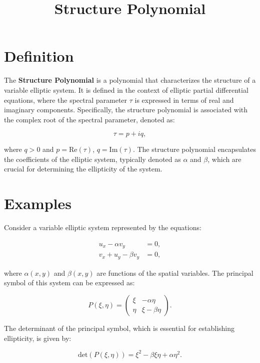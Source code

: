 \documentclass[11pt,a4paper]{article}
\title{Structure Polynomial}
\date{}
\begin{document}
\maketitle
\section{Definition}
The \textbf{Structure Polynomial} is a polynomial that characterizes the structure of a variable elliptic system. It is defined in the context of elliptic partial differential equations, where the spectral parameter $\tau$ is expressed in terms of real and imaginary components. Specifically, the structure polynomial is associated with the complex root of the spectral parameter, denoted as:

\begin{equation}
\tau = p + iq,
\end{equation}

where $q > 0$ and $p = \text{Re}(\tau)$, $q = \text{Im}(\tau)$. The structure polynomial encapsulates the coefficients of the elliptic system, typically denoted as $\alpha$ and $\beta$, which are crucial for determining the ellipticity of the system.

\section{Examples}
Consider a variable elliptic system represented by the equations:

\begin{equation}
\begin{aligned}
u_x - \alpha v_y &= 0, \\
v_x + u_y - \beta v_y &= 0,
\end{aligned}
\end{equation}

where $\alpha(x, y)$ and $\beta(x, y)$ are functions of the spatial variables. The principal symbol of this system can be expressed as:

\begin{equation}
P(\xi, \eta) = \begin{pmatrix}
\xi & -\alpha \eta \\
\eta & \xi - \beta \eta
\end{pmatrix}.
\end{equation}

The determinant of the principal symbol, which is essential for establishing ellipticity, is given by:

\begin{equation}
\text{det}(P(\xi, \eta)) = \xi^2 - \beta \xi \eta + \alpha \eta^2.
\end{equation}
\end{document}
